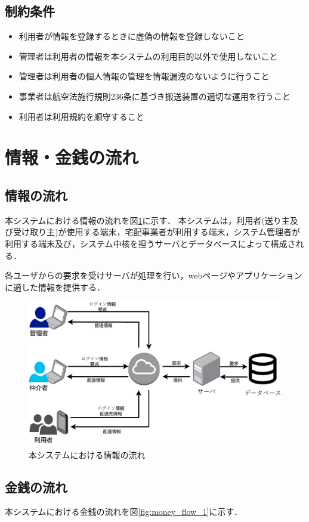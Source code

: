 \documentclass[a4paper, titlepage]{jsarticle}
\begin{document}
\subsection{制約条件}
\begin{itemize}
	\item 利用者が情報を登録するときに虚偽の情報を登録しないこと
	\item 管理者は利用者の情報を本システムの利用目的以外で使用しないこと
	\item 管理者は利用者の個人情報の管理を情報漏洩のないように行うこと
	\item 事業者は航空法施行規則236条に基づき搬送装置の適切な運用を行うこと
	\item 利用者は利用規約を順守すること
\end{itemize}
\section{情報・金銭の流れ}

\subsection{情報の流れ}
本システムにおける情報の流れを図\ref{fig:info_flow_1}に示す．
本システムは，利用者(送り主及び受け取り主)が使用する端末，宅配事業者が利用する端末，システム管理者が利用する端末及び，システム中核を担うサーバとデータベースによって構成される．

各ユーザからの要求を受けサーバが処理を行い，webページやアプリケーションに適した情報を提供する．

\begin{figure}[H]
  \centering
  \includegraphics[width=0.6\linewidth]{./info_flow.pdf}
  \caption{本システムにおける情報の流れ}
  \label{fig:info_flow_1}
\end{figure}

\subsection{金銭の流れ}
本システムにおける金銭の流れを図\ref{fig:money_flow_1}に示す．
\end{document}

